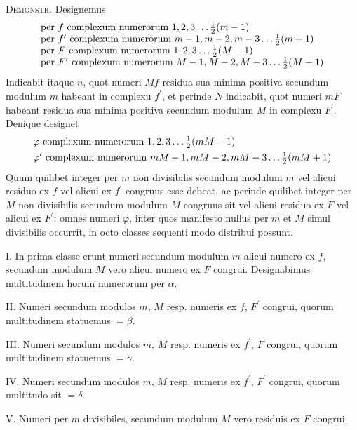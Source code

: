 \documentclass[twoside,12pt]{memoir}
\let\oldfrac\frac
\def\frac#1#2{\mathchoice{\tfrac{#1}{#2}}{\oldfrac{#1}{#2}}{\genfrac{}{}{}{2}{#1}{#2\mathstrut}}{\genfrac{}{}{}{3}{#1}{#2\mathstrut}}}
\begin{document}
\textsc{Demonstr.} Designemus
\[\begin{array}{l}
\text{per }f\text{ complexum numerorum }1,2,3 \ldots \frac{1}{2}(m-1) \\
\text{per }f^{\prime}\text{ complexum numerorum }m-1, m-2, m-3 \ldots \frac{1}{2}(m+1) \\
\text{per }F\text{ complexum numerorum }1,2,3 \ldots \frac{1}{2}({M}-1) \\
\text{per }F^{\prime}\text{ complexum numerorum }M-1, M-2, M-3 \ldots \frac{1}{2}(M+1)\\ 
\end{array}\]
Indicabit itaque \(n\), quot numeri \(M f\) residua sua minima positiva secundum modulum \(m\) habeant in complexu \(f^{\prime}\), et perinde \(N\) indicabit, quot numeri \(m F\) habeant residua sua minima positiva secundum modulum \(M\) in complexu \(F^{\prime}\). Denique designet
\[\begin{aligned}
&\varphi\text{ complexum numerorum }1, 2, 3 \ldots \frac{1}{2}(m M-1)\\
&\varphi^{\prime}\text{ complexum numerorum }m M-1, m M-2, m M-3 \ldots \frac{1}{2}(m M+1)
\end{aligned}\]
Quum quilibet integer per \(m\) non divisibilis secundum modulum \(m\) vel alicui residuo ex \(f\) vel alicui ex \(f^{\prime}\) congruus esse debeat, ac perinde quilibet integer per \(M\) non divisibilis secundum modulum \(M\) congruus sit vel alicui residuo ex \(F\) vel alicui ex \(F^{\prime}\): omnes numeri \(\varphi\), inter quos manifesto nullus per \(m\) et \(M\) simul divisibilis occurrit, in octo classes sequenti modo distribui possunt.

I. In prima classe erunt numeri secundum modulum \(m\) alicui numero ex \(f\), secundum modulum \(M\) vero alicui numero ex \(F\) congrui. Designabimus multitudinem horum numerorum per \(\alpha\).\pagebreak%
 
II. Numeri secundum modulos \(m\), \(M\) resp. numeris ex \(f\), \(F^{\prime}\) congrui, quorum multitudinem statuemus \(=\beta\).
 
III. Numeri secundum modulos \(m\), \(M\) resp. numeris ex \(f^{\prime}\), \(F\) congrui, quorum multitudinem statuemus \(=\gamma\).
 
IV. Numeri secundum modulos \(m\), \(M\) resp. numeris ex \(f^{\prime}\), \(F^{\prime}\) congrui, quorum multitudo sit \(=\delta\).
 
V. Numeri per \(m\) divisibiles, secundum modulum \(M\) vero residuis ex \(F\) congrui.
 
\end{document}

